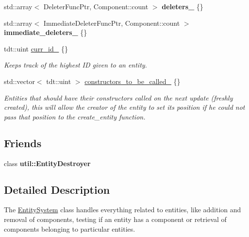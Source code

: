 \begin{DoxyCompactItemize}
\item 
std\+::array$<$ Deleter\+Func\+Ptr, Component\+::count $>$ {\bfseries deleters\+\_\+} \{\}\hypertarget{class_entity_system_aef819cf1106621e149c73f5b8163a2d0}{}\label{class_entity_system_aef819cf1106621e149c73f5b8163a2d0}

\item 
std\+::array$<$ Immediate\+Deleter\+Func\+Ptr, Component\+::count $>$ {\bfseries immediate\+\_\+deleters\+\_\+} \{\}\hypertarget{class_entity_system_a4346c0250ce6f2143534354d29476078}{}\label{class_entity_system_a4346c0250ce6f2143534354d29476078}

\item 
tdt\+::uint \hyperlink{class_entity_system_a287ccbe3b51f6e8d6d1b5f43cf238621}{curr\+\_\+id\+\_\+} \{\}
\begin{DoxyCompactList}\small\item\em Keeps track of the highest ID given to an entity. \end{DoxyCompactList}\item 
std\+::vector$<$ tdt\+::uint $>$ \hyperlink{class_entity_system_a76d26bc7c90c53486205b597dfdca7d1}{constructors\+\_\+to\+\_\+be\+\_\+called\+\_\+} \{\}
\begin{DoxyCompactList}\small\item\em Entities that should have their constructors called on the next update (freshly created), this will allow the creator of the entity to set it\textquotesingle{}s position if he could not pass that position to the create\+\_\+entity function. \end{DoxyCompactList}\end{DoxyCompactItemize}
\subsection*{Friends}
\begin{DoxyCompactItemize}
\item 
class {\bfseries util\+::\+Entity\+Destroyer}\hypertarget{class_entity_system_aebcb13ea56f5f44b8193f3c210b30ddb}{}\label{class_entity_system_aebcb13ea56f5f44b8193f3c210b30ddb}

\end{DoxyCompactItemize}


\subsection{Detailed Description}
The \hyperlink{class_entity_system}{Entity\+System} class handles everything related to entities, like addition and removal of components, testing if an entity has a component or retrieval of components belonging to particular entities. 

